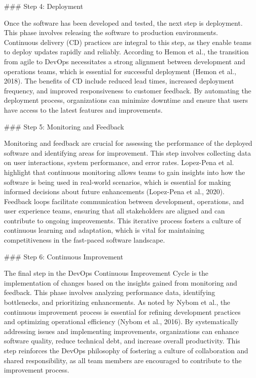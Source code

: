### Step 4: Deployment

Once the software has been developed and tested, the next step is deployment. This phase involves releasing the software to production environments. Continuous delivery (CD) practices are integral to this step, as they enable teams to deploy updates rapidly and reliably. According to Hemon et al., the transition from agile to DevOps necessitates a strong alignment between development and operations teams, which is essential for successful deployment (Hemon et al., 2018). The benefits of CD include reduced lead times, increased deployment frequency, and improved responsiveness to customer feedback. By automating the deployment process, organizations can minimize downtime and ensure that users have access to the latest features and improvements.

### Step 5: Monitoring and Feedback

Monitoring and feedback are crucial for assessing the performance of the deployed software and identifying areas for improvement. This step involves collecting data on user interactions, system performance, and error rates. Lopez-Pena et al. highlight that continuous monitoring allows teams to gain insights into how the software is being used in real-world scenarios, which is essential for making informed decisions about future enhancements (Lopez-Pena et al., 2020). Feedback loops facilitate communication between development, operations, and user experience teams, ensuring that all stakeholders are aligned and can contribute to ongoing improvements. This iterative process fosters a culture of continuous learning and adaptation, which is vital for maintaining competitiveness in the fast-paced software landscape.

### Step 6: Continuous Improvement

The final step in the DevOps Continuous Improvement Cycle is the implementation of changes based on the insights gained from monitoring and feedback. This phase involves analyzing performance data, identifying bottlenecks, and prioritizing enhancements. As noted by Nybom et al., the continuous improvement process is essential for refining development practices and optimizing operational efficiency (Nybom et al., 2016). By systematically addressing issues and implementing improvements, organizations can enhance software quality, reduce technical debt, and increase overall productivity. This step reinforces the DevOps philosophy of fostering a culture of collaboration and shared responsibility, as all team members are encouraged to contribute to the improvement process.

